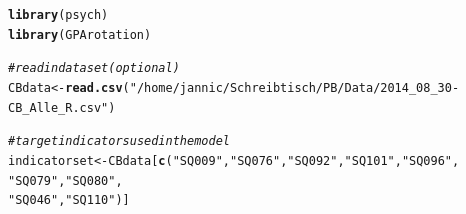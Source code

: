 \documentclass{article}\usepackage[]{graphicx}\usepackage[]{color}
\makeatletter
\newcommand{\hlstr}[1]{\textcolor[rgb]{0.192,0.494,0.8}{#1}}%
\newcommand{\hlcom}[1]{\textcolor[rgb]{0.678,0.584,0.686}{\textit{#1}}}%
\newcommand{\hlstd}[1]{\textcolor[rgb]{0.345,0.345,0.345}{#1}}%
\newcommand{\hlkwb}[1]{\textcolor[rgb]{0.69,0.353,0.396}{#1}}%
\newcommand{\hlkwd}[1]{\textcolor[rgb]{0.737,0.353,0.396}{\textbf{#1}}}%
\newenvironment{kframe}{%
 \def\at@end@of@kframe{}%
 \ifinner\ifhmode%
  \def\at@end@of@kframe{\end{minipage}}%
  \begin{minipage}{\columnwidth}%
 \fi\fi%
 \def\FrameCommand##1{\hskip\@totalleftmargin \hskip-\fboxsep
 \colorbox{shadecolor}{##1}\hskip-\fboxsep
     \hskip-\linewidth \hskip-\@totalleftmargin \hskip\columnwidth}%
 \MakeFramed {\advance\hsize-\width
   \@totalleftmargin\z@ \linewidth\hsize
   \@setminipage}}%
 {\par\unskip\endMakeFramed%
 \at@end@of@kframe}
\newenvironment{knitrout}{}{} %
\makeatother
\begin{document}
\begin{knitrout}
\color{fgcolor}\begin{kframe}
\begin{alltt}
\hlkwd{library}\hlstd{(psych)}
\hlkwd{library}\hlstd{(GPArotation)}

\hlcom{#read in dataset (optional)}
\hlstd{CBdata} \hlkwb{<-} \hlkwd{read.csv}\hlstd{(}\hlstr{"/home/jannic/Schreibtisch/PB/Data/2014_08_30-CB_Alle_R.csv"}\hlstd{)}

\hlcom{#target indicators used in the model}
\hlstd{indicatorset} \hlkwb{<-} \hlstd{CBdata[}\hlkwd{c}\hlstd{(}\hlstr{"SQ009"}\hlstd{,}\hlstr{"SQ076"}\hlstd{,}\hlstr{"SQ092"}\hlstd{,}\hlstr{"SQ101"}\hlstd{,}\hlstr{"SQ096"}\hlstd{,}
                \hlstr{"SQ079"}\hlstd{,}\hlstr{"SQ080"}\hlstd{,}
                \hlstr{"SQ046"}\hlstd{,}\hlstr{"SQ110"}\hlstd{) ]}


\end{alltt}
\end{kframe}
\end{knitrout}
\end{document}
